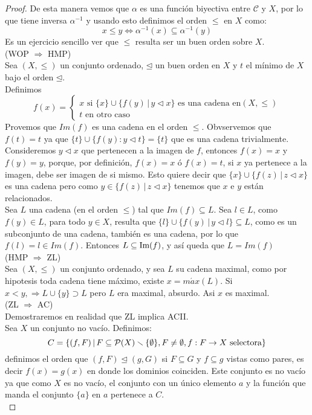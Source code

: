 \documentclass[12pt,a4paper]{book}
\begin{document}
\begin{teo}
\begin{proof}
De esta manera vemos que $\alpha$ es una función biyectiva entre $\mathcal{C}$ y $X$, por lo que tiene inversa $\alpha^{-1}$ y usando esto definimos el orden $\leq$ en $X$ como:
$$ x \leq y \Leftrightarrow \alpha^{-1}(x) \subseteq \alpha^{-1}(y)$$
Es un ejercicio sencillo ver que $\leq$ resulta ser un buen orden sobre $X$.\\[0.5cm]
(WOP $\Rightarrow$ HMP)\\
Sea $(X,\leq)$ un conjunto ordenado, $\unlhd$ un buen orden en $X$ y $t$ el mínimo de $X$ bajo el orden $\unlhd$.\\
Definimos 
\[ f(x) = 
\begin{cases}
   x   \text{  si } \{x\} \cup \{f(y)\,\vert\, y \lhd x\} \text{ es una cadena en} (X,\leq) \\
   t   \text{  en otro caso } 
  \end{cases}
\]
Provemos que $Im(f)$ es una cadena en el orden $\leq$. Obvservemos que $f(t)=t$ ya que $\{t\} \cup \{f(y): y \lhd t\} = \{t\}$ que es una cadena trivialmente. Consideremos $y \lhd x$ que pertenecen a la imagen de $f$, entonces $f(x)=x$ y $f(y)=y$, porque, por definición, $f(x)=x$ ó $f(x)=t$, si $x$ ya pertenece a la imagen, debe ser imagen de si mismo. Esto quiere decir que $\{x\} \cup \{f(z) \,\vert\, z \lhd x\}$ es una cadena pero como $y \in \{f(z)\,\vert\, z \lhd x\}$ tenemos que $x$ e $y$ están relacionados.\\
Sea $L$ una cadena (en el orden $\leq$) tal que $Im(f) \subseteq L$. Sea $l \in L$, como $f(y) \in L$, para todo  $y \in X$, resulta que $\{ l \} \cup \{f(y)\,\vert\, y \lhd l \} \subseteq L$, como es un subconjunto de una cadena, también es una cadena, por lo que $f(l) = l \in Im(f)$. Entonces $L \subseteq \Ima(f)$, y así queda que $L = Im(f)$\\[0.5cm]
(HMP $\Rightarrow $ ZL)\\
Sea $(X,\leq)$ un conjunto ordenado, y sea $L$ su cadena maximal, como por hipotesis toda cadena tiene máximo, existe $x = m\acute{a}x(L)$.
Si $ x < y, \Rightarrow L \cup \{y\} \supset L$ pero $L$ era maximal, absurdo. Asi $x$ es maximal.\\[0.5cm]
(ZL $\Rightarrow$ AC)\\
Demostraremos en realidad que ZL implica ACII.\\
Sea $X$ un conjunto no vacío. Definimos:
$$ C = \{(f,F) \,\vert\, F \subseteq \P(X) \smallsetminus \{\emptyset\}, F \neq \emptyset, f: F \rightarrow X \mbox{ selectora} \}$$
definimos el orden que $(f,F) \unlhd (g,G)$ si $F \subseteq G$ y $f \subseteq g$ vistas como pares, es decir $f(x) = g(x)$ en donde los dominios coinciden. Este conjunto es no vacío ya que como $X$ es no vacío, el conjunto con un único elemento $a$ y la función que manda el conjunto $\{a\}$ en $a$ pertenece a $C$.\\

\end{proof}
\end{teo}
\end{document}
